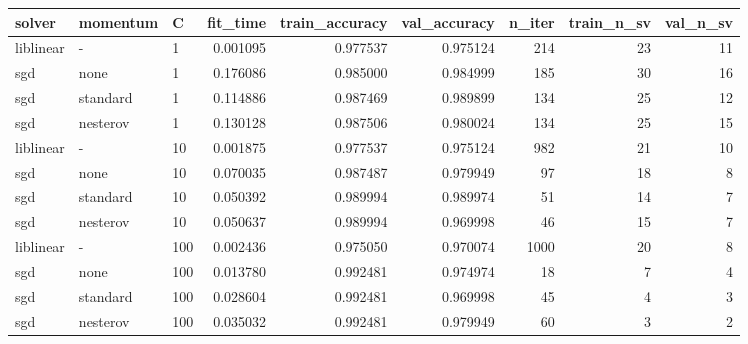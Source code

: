 \begin{tabular}{lllrrrrrr}
\toprule
   solver & momentum &   C &  fit\_time &  train\_accuracy &  val\_accuracy &  n\_iter &  train\_n\_sv &  val\_n\_sv \\
\midrule
liblinear &        - &   1 &  0.001095 &        0.977537 &      0.975124 &     214 &          23 &        11 \\
      sgd &     none &   1 &  0.176086 &        0.985000 &      0.984999 &     185 &          30 &        16 \\
      sgd & standard &   1 &  0.114886 &        0.987469 &      0.989899 &     134 &          25 &        12 \\
      sgd & nesterov &   1 &  0.130128 &        0.987506 &      0.980024 &     134 &          25 &        15 \\
liblinear &        - &  10 &  0.001875 &        0.977537 &      0.975124 &     982 &          21 &        10 \\
      sgd &     none &  10 &  0.070035 &        0.987487 &      0.979949 &      97 &          18 &         8 \\
      sgd & standard &  10 &  0.050392 &        0.989994 &      0.989974 &      51 &          14 &         7 \\
      sgd & nesterov &  10 &  0.050637 &        0.989994 &      0.969998 &      46 &          15 &         7 \\
liblinear &        - & 100 &  0.002436 &        0.975050 &      0.970074 &    1000 &          20 &         8 \\
      sgd &     none & 100 &  0.013780 &        0.992481 &      0.974974 &      18 &           7 &         4 \\
      sgd & standard & 100 &  0.028604 &        0.992481 &      0.969998 &      45 &           4 &         3 \\
      sgd & nesterov & 100 &  0.035032 &        0.992481 &      0.979949 &      60 &           3 &         2 \\
\bottomrule
\end{tabular}
